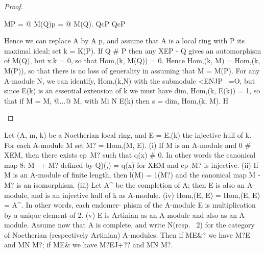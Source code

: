 \begin{proof}
\begin{mathematicalrecord}
              MP = @ M(Q)p = @ M(Q).
                     QcP             QcP

      Hence we can replace A by A p, and assume that A is a local ring with P
      its maximal ideal; set k = K(P). If Q # P then any XEP - Q gives an
      automorphism of M(Q), but x.k = 0, so that Hom,(k, M(Q)) = 0. Hence
      Hom,(k, M) = Hom,(k, M(P)), so that there is no loss of generality in
assuming that M = M(P). For any A-module N, we can identify,
Hom,(k,N)     with the submodule {<ENJP~ =O}, but since E(k) is an
essential extension of k we must have dim, Hom,(k, E(k)) = 1, so that if
M = M, @...@ M, with Mi N E(k) then s = dim, Hom,(k, M). H
\end{mathematicalrecord}
\end{proof}


\begin{theorem}[Theorem 18.6]\label{mcrt-auto-theorem-18-6}
\begin{mathematicalrecord}
Let (A, m, k) be a Noetherian local ring, and E = E,(k) the
injective hull of k. For each A-module M set M? = Hom,(M, E).
    (i) If M is an A-module and 0 # XEM, then there exists cp~M? such that
q(x) # 0. In other words the canonical map 8: M --+ M? defined by Q)(,)
 = q(x) for XEM and cp~M? is injective.
    (ii) If M is an A-module of finite length, then l(M) = 1(M?) and the
canonical map M -M?            is an isomorphism.
    (iii) Let A^ be the completion of A; then E is also an A-module, and
is an injective hull of k as A-module.
    (iv) Hom,(E, E) = Hom,(E, E) = A^. In other words, each endomer-
phism of the A-module E is multiplication         by a unique element of 2.
    (v) E is Artinian as an A-module and also as an A-module. Assume
now that A is complete, and write N(resp. ~2) for the category of
Noetherian (respectively Artinian) A-modules. Then if ME&? we have
M?E~       and MN M?; if ME& we have M?EJ+?? and MN M?.
\end{mathematicalrecord}
\end{theorem}
